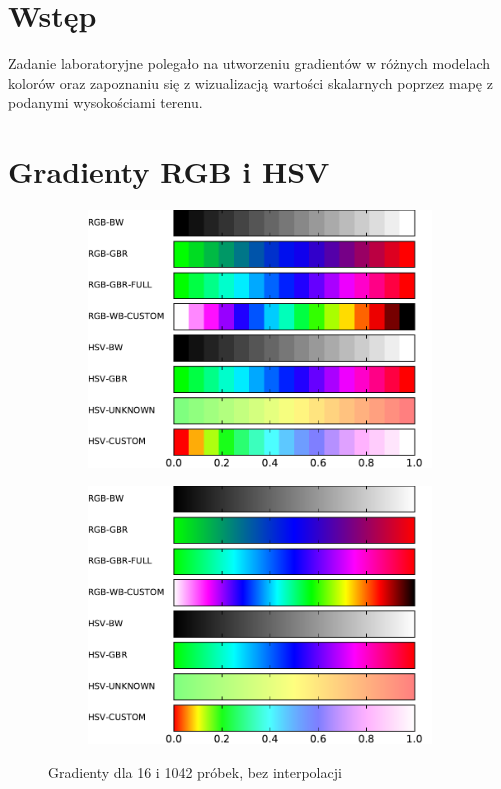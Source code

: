 \documentclass{article}
\begin{document}


\section{Wstęp}
Zadanie laboratoryjne polegało na utworzeniu gradientów w różnych modelach kolorów oraz zapoznaniu się z wizualizacją wartości skalarnych poprzez mapę z podanymi wysokościami terenu.
\section{Gradienty RGB i HSV}
\begin{figure}
	\begin{subfigure}{0.5\textwidth}
		\begin{center}
			\includegraphics[width=\textwidth]{my-gradients16.pdf}
		\end{center}
	\end{subfigure}
	\begin{subfigure}{0.5\textwidth}
		\begin{center}
			\includegraphics[width=\textwidth]{my-gradients1024.pdf}	
		\end{center}
	\end{subfigure}		
\caption{Gradienty dla 16 i 1042 próbek, bez interpolacji}
\label{fig:gradienty}
\end{figure}
\end{document}

